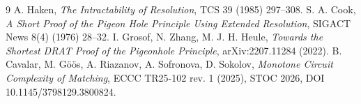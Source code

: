 \documentclass[11pt]{article}
\begin{document}
\begin{thebibliography}{9}
 A. Haken, \emph{The Intractability of Resolution}, TCS 39 (1985) 297--308.
 S. A. Cook, \emph{A Short Proof of the Pigeon Hole Principle Using Extended Resolution}, SIGACT News 8(4) (1976) 28--32.
 I. Grosof, N. Zhang, M. J. H. Heule, \emph{Towards the Shortest DRAT Proof of the Pigeonhole Principle}, arXiv:2207.11284 (2022).
 B. Cavalar, M. G\"o\"os, A. Riazanov, A. Sofronova, D. Sokolov, \emph{Monotone Circuit Complexity of Matching}, ECCC TR25-102 rev. 1 (2025), STOC 2026, DOI 10.1145/3798129.3800824.
\end{thebibliography}
\end{document}
